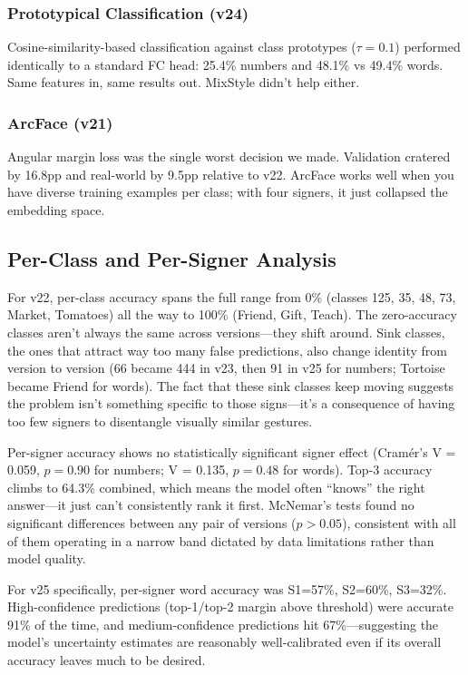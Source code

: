 \documentclass[conference]{IEEEtran}
\begin{document}
\subsubsection{Prototypical Classification (v24)}
Cosine-similarity-based classification against class prototypes ($\tau=0.1$) performed identically to a standard FC head: 25.4\% numbers and 48.1\% vs 49.4\% words. Same features in, same results out. MixStyle didn't help either.

\subsubsection{ArcFace (v21)}
Angular margin loss was the single worst decision we made. Validation cratered by 16.8pp and real-world by 9.5pp relative to v22. ArcFace works well when you have diverse training examples per class; with four signers, it just collapsed the embedding space.

\subsection{Per-Class and Per-Signer Analysis}

For v22, per-class accuracy spans the full range from 0\% (classes 125, 35, 48, 73, Market, Tomatoes) all the way to 100\% (Friend, Gift, Teach). The zero-accuracy classes aren't always the same across versions---they shift around. Sink classes, the ones that attract way too many false predictions, also change identity from version to version (66 became 444 in v23, then 91 in v25 for numbers; Tortoise became Friend for words). The fact that these sink classes keep moving suggests the problem isn't something specific to those signs---it's a consequence of having too few signers to disentangle visually similar gestures.

Per-signer accuracy shows no statistically significant signer effect (Cram\'{e}r's V = 0.059, $p = 0.90$ for numbers; V = 0.135, $p = 0.48$ for words). Top-3 accuracy climbs to 64.3\% combined, which means the model often ``knows'' the right answer---it just can't consistently rank it first. McNemar's tests found no significant differences between any pair of versions ($p > 0.05$), consistent with all of them operating in a narrow band dictated by data limitations rather than model quality.

For v25 specifically, per-signer word accuracy was S1=57\%, S2=60\%, S3=32\%. High-confidence predictions (top-1/top-2 margin above threshold) were accurate 91\% of the time, and medium-confidence predictions hit 67\%---suggesting the model's uncertainty estimates are reasonably well-calibrated even if its overall accuracy leaves much to be desired.
\end{document}
